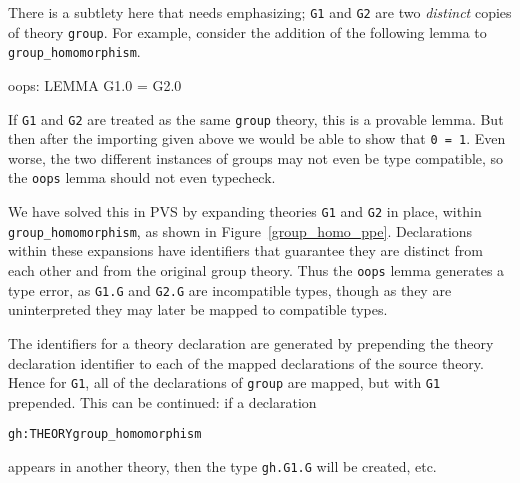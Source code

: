 \documentclass[11pt,twoside,openright,titlepage]{cslreport}
\begin{document}
There is a subtlety here that needs emphasizing; \texttt{G1} and
\texttt{G2} are two \emph{distinct} copies of theory \texttt{group}.
For example, consider the addition of the following lemma to
\texttt{group\_homomorphism}.
\begin{session}
oops: LEMMA G1.0 = G2.0
\end{session}
\noindent If \texttt{G1} and \texttt{G2} are treated as the same
\texttt{group} theory, this is a provable lemma.  But then after the
importing given above we would be able to show that \texttt{0 = 1}.  Even
worse, the two different instances of groups may not even be type
compatible, so the \texttt{oops} lemma should not even typecheck.

We have solved this in PVS by expanding theories \texttt{G1} and
\texttt{G2} in place, within \texttt{group\_homomorphism}, as shown in
Figure~\ref{group_homo_ppe}.  Declarations within these expansions have
identifiers that guarantee they are distinct from each other and from the
original group theory.  Thus the \texttt{oops} lemma generates a type
error, as \texttt{G1.G} and \texttt{G2.G} are incompatible types, though
as they are uninterpreted they may later be mapped to compatible types.

The identifiers for a theory declaration are generated by prepending the
theory declaration identifier to each of the mapped declarations of the
source theory.  Hence for \texttt{G1}, all of the declarations of
\texttt{group} are mapped, but with \texttt{G1} prepended.  This can be
continued: if a declaration
\begin{alltt}
 gh: THEORY group_homomorphism
\end{alltt}
appears in another theory, then the type \texttt{gh.G1.G} will be created, etc.
\end{document}
